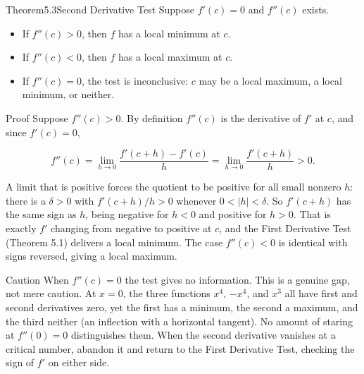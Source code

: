 \documentclass[a4paper,12pt,oneside]{memoir}
\begin{document}
\begin{envtheorem}{Theorem}{5.3}{Second Derivative Test}
Suppose \(f'(c) = 0\) and \(f''(c)\) exists.

\begin{itemize}
  \item If \(f''(c) > 0\), then \(f\) has a local minimum at \(c\).
  \item If \(f''(c) < 0\), then \(f\) has a local maximum at \(c\).
  \item If \(f''(c) = 0\), the test is inconclusive: \(c\) may be a local maximum, a local minimum, or neither.
\end{itemize}
\end{envtheorem}
\begin{envproof}{Proof}{}{}
Suppose \(f''(c) > 0\). By definition \(f''(c)\) is the derivative of \(f'\) at \(c\), and since \(f'(c) = 0\),

\[ f''(c) = \lim_{h \to 0} \frac{f'(c + h) - f'(c)}{h} = \lim_{h \to 0} \frac{f'(c + h)}{h} > 0. \]

A limit that is positive forces the quotient to be positive for all small nonzero \(h\): there is a \(\delta > 0\) with \(f'(c + h)/h > 0\) whenever \(0 < |h| < \delta\). So \(f'(c + h)\) has the same sign as \(h\), being negative for \(h < 0\) and positive for \(h > 0\). That is exactly \(f'\) changing from negative to positive at \(c\), and the First Derivative Test (Theorem 5.1) delivers a local minimum. The case \(f''(c) < 0\) is identical with signs reversed, giving a local maximum. \qedmark
\end{envproof}
\begin{envcaution}{Caution}{}{}
When \(f''(c) = 0\) the test gives no information. This is a genuine gap, not mere caution. At \(x = 0\), the three functions \(x^{4}\), \(-x^{4}\), and \(x^{3}\) all have first and second derivatives zero, yet the first has a minimum, the second a maximum, and the third neither (an inflection with a horizontal tangent). No amount of staring at \(f''(0) = 0\) distinguishes them. When the second derivative vanishes at a critical number, abandon it and return to the First Derivative Test, checking the sign of \(f'\) on either side.
\end{envcaution}
\end{document}
